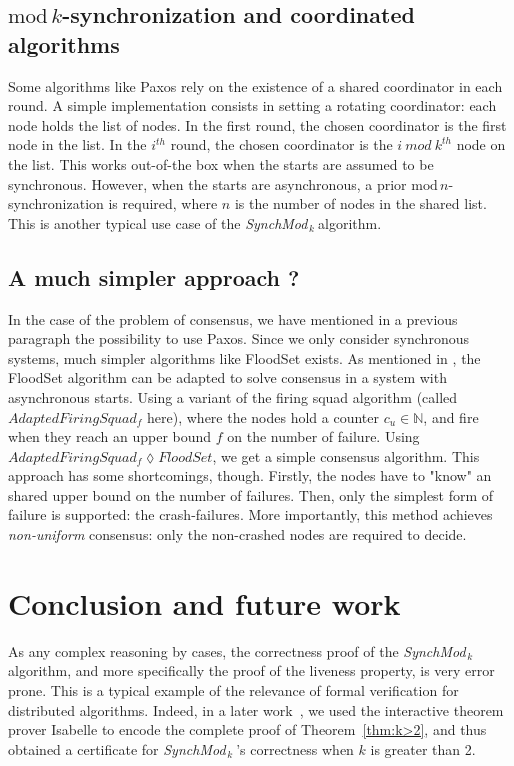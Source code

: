 \documentclass{article}
\newcommand{\SM}{{\em SynchMod}$_{\,k}\ $}
\begin{document}
\subsection{$\mathrm{mod}\,k$-synchronization and coordinated algorithms}

Some algorithms like Paxos rely on the existence of a shared coordinator in each round.
A simple implementation consists in setting a rotating coordinator: 
each node holds the list of nodes. In the first round, the chosen coordinator is the first node in the list.
In the $i^{th}$ round, the chosen coordinator is the $i~mod~k^{th}$ node on the list.
This works out-of-the box when the starts are assumed to be synchronous.
However, when the starts are asynchronous, a prior $\mathrm{mod}\,n$-synchronization is required, where $n$ is the number of nodes in the shared list.
This is another typical use case of the \SM algorithm.

\subsection{A much simpler approach ?}

In the case of the problem of consensus, we have mentioned in a previous paragraph the possibility to use Paxos.
Since we only consider synchronous systems, much simpler algorithms like FloodSet \cite{lynch_distributed} exists.
As mentioned in \cite{distributed_firing_squad}, the FloodSet algorithm can be adapted to solve consensus in a system with asynchronous starts.
Using a variant of the firing squad algorithm (called $AdaptedFiringSquad_f$ here),
where the nodes hold a counter $c_u \in \mathds{N}$, and fire when they reach an upper bound $f$ on the number of failure.
Using $AdaptedFiringSquad_f \lozenge FloodSet$, we get a simple consensus algorithm.
This approach has some shortcomings, though.
Firstly, the nodes have to "know" an shared upper bound on the number of failures.
Then, only the simplest form of failure is supported: the crash-failures.
More importantly, this method achieves \textit{non-uniform} consensus: only the non-crashed nodes are required to decide.

\section{Conclusion and future work}

As any complex reasoning by cases, the correctness proof  of the \SM   algorithm, 
	and more specifically the proof of the liveness property, is very error prone. 
This is a typical example of the relevance of formal verification for distributed algorithms. 
Indeed, in a later work~\cite{}, we used the interactive theorem prover Isabelle \cite{HO_isa} to encode the complete proof 
	of Theorem~\ref{thm:k>2}, and thus obtained a certificate for  \SM\!\!'s correctness when $k$ is greater than 2.
	
\end{document}
